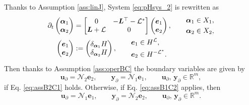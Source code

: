 Thanks to Assumption \ref{ass:linJ}, System \eqref{eq:pHsys_2} is rewritten as 
\begin{subequations}
	\label{eq:pHsys_ass} 
	\begin{align}
	\partial_t \begin{pmatrix}
	{\bm{\alpha}}_1 \\ {\bm{\alpha}}_2
	\end{pmatrix} &= \begin{bmatrix}
	0 & -\bm{L}^\top - \mathcal{L}^* \\
	\bm{L} + \mathcal{L} & 0 \\
	\end{bmatrix}\begin{pmatrix}
	\bm{e}_1 \\ \bm{e}_2
	\end{pmatrix} , \qquad \begin{aligned}
	\bm{\alpha}_1 \in X_1, 	\\
	\bm{\alpha}_2 \in X_2, 
	\end{aligned} \label{eq:pHsys_dyn_ass} \vspace{3pt}\\
	\begin{pmatrix}
	\bm{e}_1 \\ \bm{e}_2
	\end{pmatrix} &:= \begin{pmatrix}
	\delta_{\bm{\alpha}_1}H \\ \delta_{\bm{\alpha}_2}H
	\end{pmatrix} , \qquad \begin{aligned}
	\bm{e}_1 &\in H^\mathcal{L}, 	\\
	\bm{e}_2 &\in H^{-\mathcal{L}^*}.
	\end{aligned} \label{eq:pHsys_const_ass} 
	\end{align}
\end{subequations}
Then thanks to Assumption \ref{ass:operBC} the boundary variables are given by 
\begin{equation}\label{eq:pHsys_assB2C1}
\bm{u}_\partial = \mathcal{N}_2 \displaystyle \bm{e}_2, \qquad  \bm{y}_\partial = \mathcal{N}_1 \displaystyle \bm{e}_1, \qquad  \bm{u}_\partial,\, \bm{y}_\partial \in \mathbb{R}^m,
\end{equation}
if Eq. \eqref{eq:assB2C1} holds. Otherwise, if Eq. \eqref{eq:assB1C2} applies, then
\begin{equation}\label{eq:pHsys_assB1C2}
\bm{u}_\partial = \mathcal{N}_1 \displaystyle \bm{e}_1, \qquad 
\bm{y}_\partial = \mathcal{N}_2 \displaystyle \bm{e}_2, \qquad  \bm{u}_\partial,\, \bm{y}_\partial \in \mathbb{R}^m. 
\end{equation}
